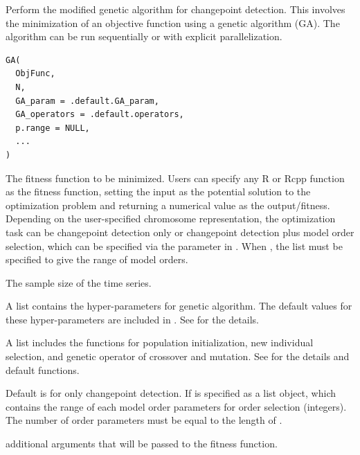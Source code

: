 \documentclass[a4paper]{book}
\begin{document}
%
\begin{Description}
Perform the modified genetic algorithm for changepoint detection.
This involves the minimization of an objective function using a genetic algorithm (GA).
The algorithm can be run sequentially or with explicit parallelization.
\end{Description}
%
\begin{Usage}
\begin{verbatim}
GA(
  ObjFunc,
  N,
  GA_param = .default.GA_param,
  GA_operators = .default.operators,
  p.range = NULL,
  ...
)
\end{verbatim}
\end{Usage}
%
\begin{Arguments}
\begin{ldescription}
\item[\code{ObjFunc}] The fitness function to be minimized. Users can specify any R or Rcpp
function as the fitness function, setting the input as the potential solution to
the optimization problem and returning a numerical value as the output/fitness.
Depending on the user-specified chromosome representation, the optimization task
can be changepoint detection only or changepoint detection plus model order selection,
which can be specified via the  parameter in . When
, the list  must be specified to give the range
of model orders.

\item[\code{N}] The sample size of the time series.

\item[\code{GA\_param}] A list contains the hyper-parameters for genetic algorithm.
The default values for these hyper-parameters are included in .
See  for the details.

\item[\code{GA\_operators}] A list includes the functions for population initialization,
new individual selection, and genetic operator of crossover and mutation.
See  for the details and default functions.

\item[\code{p.range}] Default is  for only changepoint detection. If
 is specified as a list object, which contains the range of
each model order parameters for order selection (integers). The number of
order parameters must be equal to the length of .

\item[\code{...}] additional arguments that will be passed to the fitness function.
\end{ldescription}
\end{Arguments}
\end{document}

